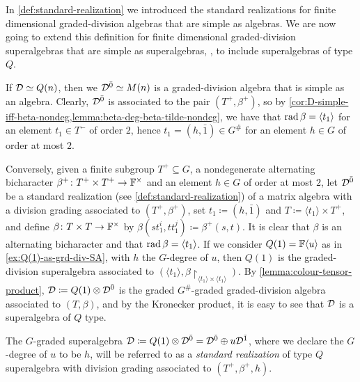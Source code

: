 In \cref{def:standard-realization} we introduced the standard realizations for finite dimensional graded-division algebras that are simple as algebras. 
We are now going to extend this definition for finite dimensional graded-division superalgebras that are simple as superalgebras, \ie, to include superalgebras of type $Q$. 

If $\mathcal{D} \simeq Q(n)$, then we $\mathcal{D}^{\bar0} \simeq M(n)$ is a graded-division algebra that is simple as an algebra. 
Clearly, $\mathcal{D}^{\bar0}$ is associated to the pair $(T^+, \beta^+)$, so by \cref{cor:D-simple-iff-beta-nondeg,lemma:beta-deg-beta-tilde-nondeg}, we have that $\operatorname{rad} \beta = \langle t_1 \rangle$ for an element $t_1\in T^-$ of order $2$, hence $t_1 = (h, \bar 1) \in G^\#$ for an element $h \in G$ of order at most $2$. 

Conversely, given a finite subgroup $T^+ \subseteq G$, a nondegenerate alternating bicharacter $\beta^+\colon T^+ \times T^+ \to \mathbb{F}^\times$ and an element $h\in G$ of order at most $2$, let $\mathcal{D}^{\bar0}$ be a standard realization (see \cref{def:standard-realization}) of a matrix algebra with a division grading associated to $(T^+, \beta^+)$, set $t_1 \coloneqq (h, \bar 1)$ and $T \coloneqq \langle t_1 \rangle \times T^+$, and define $\beta\colon T \times T \to \mathbb{F}^\times$ by $\beta(s t_1^i, t t_1^j) \coloneqq \beta^+(s,t)$. 
It is clear that $\beta$ is an alternating bicharacter and that $\operatorname{rad} \beta = \langle t_1 \rangle$. 
If we consider $Q(1) = \mathbb{F} \langle u \rangle$ as in \cref{ex:Q(1)-as-grd-div-SA}, with $h$ the $G$-degree of $u$, then $Q(1)$ is the graded-division superalgebra associated to $(\langle t_1 \rangle, \beta\restriction_{ \langle t_1 \rangle \times \langle t_1 \rangle })$. 
By \cref{lemma:colour-tensor-product}, $\mathcal{D} \coloneqq Q(1)\otimes \mathcal{D}^{\bar0}$ is the graded $G^\#$-graded graded-division algebra associated to $(T, \beta)$, and by the Kronecker product, it is easy to see that $\mathcal{D}$ is a superalgebra of $Q$ type. 

\begin{defi}\label{def:standard-realization-Q}
    The $G$-graded superalgebra $\mathcal{D} \coloneqq Q(1) \otimes \mathcal{D}^{\bar0} = \mathcal{D}^{\bar0} \oplus u\mathcal{D}^{\bar1}$, where we declare the $G$-degree of $u$ to be $h$, will be referred to as a \emph{standard realization} of type $Q$ superalgebra with division grading associated to $(T^+, \beta^+, h)$.
\end{defi}


